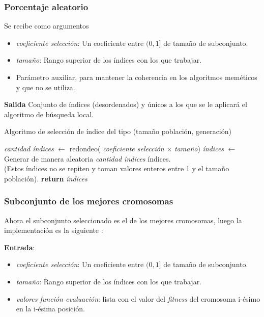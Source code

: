 \subsubsection{Porcentaje aleatorio}  

Se recibe como argumentos
\begin{itemize}
    \item \textit{coeficiente selección}: Un coeficiente entre $(0,1]$ de tamaño de subconjunto.
    \item \textit {tamaño}: Rango superior de los índices con los que trabajar. 
    \item Parámetro auxiliar, para mantener la coherencia en los algoritmos meméticos y que no se utiliza. 
\end{itemize}

\textbf{Salida} Conjunto de índices (desordenados) y únicos a los que se le aplicará el algoritmo de búsqueda local. 
\begin{algorithm}[H]
    \caption{Algoritmo de selección de índice del tipo (tamaño población, generación)}
    \begin{algorithmic}[1]
        \State \textit{cantidad índices} $\gets$ redondeo( \textit{coeficiente selección} $\times$   \textit {tamaño})
        \State  \textit{índices} $\gets$ Generar de manera aleatoria \textit{cantidad índices} índices. \\
        (Estos índices no se repiten y toman valores enteros entre 1 y el tamaño población).  
        \State \textbf{return}  \textit{índices}
    \end{algorithmic}
\end{algorithm}

\subsubsection{Subconjunto de los mejores cromosomas}  

Ahora el subconjunto seleccionado es el de los mejores cromosomas, luego la implementación es la siguiente : 

\textbf{Entrada}: 
\begin{itemize}
    \item \textit{coeficiente selección}: Un coeficiente entre $(0,1]$ de tamaño de subconjunto.
    \item \textit {tamaño}: Rango superior de los índices con los que trabajar. 
    \item \textit{valores función evaluación}: lista con el valor del \textit{fitness} del cromosoma i-ésimo en la i-ésima posición. 
\end{itemize}

